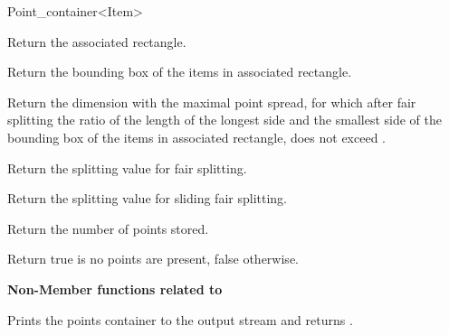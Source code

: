 \begin{ccRefClass}{Point_container<Item>}
\begin{ccAdvanced}
{Return the associated rectangle.}

{Return the bounding box of the items in associated rectangle.}

{Return the dimension with the maximal point spread, for which after fair splitting
the ratio of the length of the longest side and the smallest side of the bounding box of
the items in associated rectangle,
does not exceed .}

{Return the splitting value for fair splitting.}

{Return the splitting value for sliding fair splitting.}

{
Return the number of points stored.
}

{
Return true is no points are present, false otherwise.
}




{\bf Non-Member functions related to }

\ccGlueBegin
{}
{Prints the points container  to the output stream  and returns .}
\ccGlueEnd

\end{ccAdvanced}

\end{ccRefClass}


